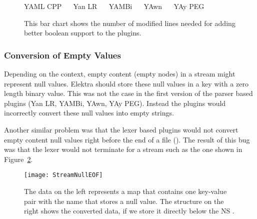 \begin{figure}[H]
  \begin{bchart}[max=20, width=0.8\textwidth, unit={~Lines of Code}]
  \end{bchart}
  \begin{center}
  \vspace{-0.5cm}
     YAML CPP ~~
     Yan LR ~~
     YAMBi ~~
     YAwn ~~
     YAy PEG
  \vspace{-0.5cm}
  \end{center}
  \caption{This bar chart shows the number of modified lines needed for adding better boolean support to the  plugins.}
  \label{fig:boolean_line_count}
\end{figure}

\subsubsection{Conversion of Empty Values}

Depending on the context, empty content (empty nodes) in a  stream might represent null values. Elektra should store these null values in a key with a zero length binary value. This was not the case in the first version of the parser based  plugins (Yan LR, YAMBi, YAwn, YAy PEG). Instead the plugins would incorrectly convert these null values into empty strings.

Another similar problem was that the lexer based plugins would not convert empty content null values right before the end of a file (). The result of this bug was that the lexer would not terminate for a stream such as the one shown in Figure~\ref{fig:Figures_StreamNullEOF}.

\begin{figure}[H]
  \centering
    \texttt{[image: StreamNullEOF]}
  \caption{The  data on the left represents a map that contains one key-value pair with the name  that stores a null value. The  structure on the right shows the converted  data, if we store it directly below the \gls{NS} .}
  \label{fig:Figures_StreamNullEOF}
\end{figure}


